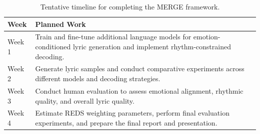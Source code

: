 \documentclass[12pt]{article}
\begin{document}
\begin{table}[h]
\centering
\small
\begin{tabular}{p{1.5cm} p{6.5cm}}
\toprule
\textbf{Week} & \textbf{Planned Work} \\
\midrule

Week 1 &
Train and fine-tune additional language models for emotion-conditioned lyric generation and implement rhythm-constrained decoding. \\

Week 2 &
Generate lyric samples and conduct comparative experiments across different models and decoding strategies. \\

Week 3 &
Conduct human evaluation to assess emotional alignment, rhythmic quality, and overall lyric quality. \\

Week 4 &
Estimate REDS weighting parameters, perform final evaluation experiments, and prepare the final report and presentation. \\

\bottomrule
\end{tabular}

\caption{Tentative timeline for completing the MERGE framework.}
\label{tab:timeline}
\end{table}
\end{document}
